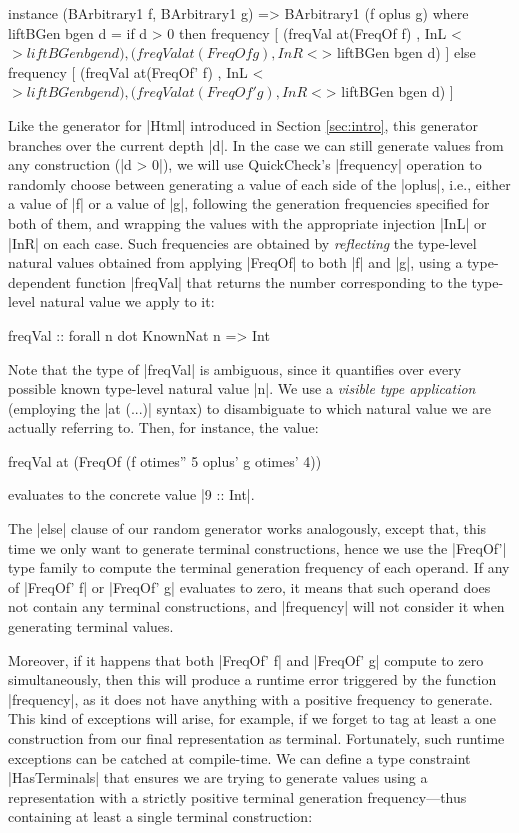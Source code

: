 \begin{code}
instance (BArbitrary1 f, BArbitrary1 g)
  => BArbitrary1 (f oplus g) where
  liftBGen bgen d =
    if d > 0
    then frequency
      [ (freqVal  at(FreqOf f) ,  InL <$> liftBGen bgen d)
      , (freqVal  at(FreqOf g) ,  InR <$> liftBGen bgen d) ]
    else frequency
      [ (freqVal  at(FreqOf' f) ,  InL <$> liftBGen bgen d)
      , (freqVal  at(FreqOf' g) ,  InR <$> liftBGen bgen d) ]
\end{code}
%
Like the generator for |Html| introduced in Section \ref{sec:intro}, this
generator branches over the current depth |d|.
%
In the case we can still generate values from any construction (|d > 0|), we
will use QuickCheck's |frequency| operation to randomly choose between
generating a value of each side of the |oplus|, i.e., either a value of |f| or a
value of |g|, following the generation frequencies specified for both of them,
and wrapping the values with the appropriate injection |InL| or |InR| on each
case.
%
Such frequencies are obtained by \emph{reflecting} the type-level natural values
obtained from applying |FreqOf| to both |f| and |g|, using a type-dependent
function |freqVal| that returns the number corresponding to the type-level
natural value we apply to it:

\begin{code}
freqVal :: forall n dot KnownNat n => Int
\end{code}
%
Note that the type of |freqVal| is ambiguous, since it quantifies over every
possible known type-level natural value |n|.
%
We use a \emph{visible type application} \cite{eisenberg2016visible} (employing
the |at (...)| syntax) to disambiguate to which natural value we are actually
referring to.
%
Then, for instance, the value:

\begin{code}
  freqVal at (FreqOf (f otimes'' 5 oplus' g otimes' 4))
\end{code}
%
evaluates to the concrete value |9 :: Int|.


The |else| clause of our random generator works analogously, except that, this
time we only want to generate terminal constructions, hence we use the |FreqOf'|
type family to compute the terminal generation frequency of each operand.
%
If any of |FreqOf' f| or |FreqOf' g| evaluates to zero, it means that such
operand does not contain any terminal constructions, and |frequency| will not
consider it when generating terminal values.


Moreover, if it happens that both |FreqOf' f| and |FreqOf' g| compute to zero
simultaneously, then this will produce a runtime error triggered by the function
|frequency|, as it does not have anything with a positive frequency to generate.
%
This kind of exceptions will arise, for example, if we forget to tag at least a
one construction from our final representation as terminal.
%
Fortunately, such runtime exceptions can be catched at compile-time.
%
We can define a type constraint |HasTerminals| that ensures we are trying to
generate values using a representation with a strictly positive terminal
generation frequency---thus containing at least a single terminal construction:


